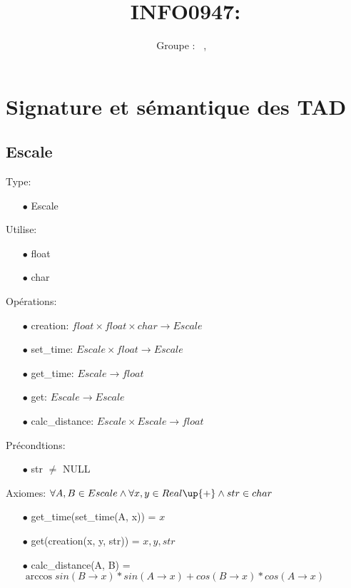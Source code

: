 \documentclass[a4paper, 11pt, oneside]{article}
\title{INFO0947: \intitule}
\author{Groupe \GrNbr : \PrenomUN~\textsc{\NomUN}, \PrenomDEUX~\textsc{\NomDEUX}}
\date{}
\newcommand{\tablemat}{~}
\renewcommand{\tablemat}{\tableofcontents}
\begin{document}
\maketitle
\newpage
\tablemat
\newpage

\section{Signature et sémantique des TAD}
\subsection{Escale}

\noindent Type: 
    \begin{itemize}
        \item[$\bullet$] Escale
    \end{itemize}
    Utilise: 
    \begin{itemize}
        \item[$\bullet$] float
        \item[$\bullet$] char
    \end{itemize}
    Opérations: 
    \begin{itemize}
        \item[$\bullet$] creation: $float \times float \times char \rightarrow Escale$
        \item[$\bullet$] set\_time: $Escale \times float \rightarrow Escale$
        \item[$\bullet$] get\_time: $Escale \rightarrow float$
        \item[$\bullet$] get: $Escale \rightarrow Escale$
        \item[$\bullet$] calc\_distance: $Escale \times Escale \rightarrow float$
    \end{itemize}
    Précondtions:
    \begin{itemize}
        \item[$\bullet$] str $\ne$ NULL
    \end{itemize}
    Axiomes: $ \forall A, B \in Escale \land \forall x,y \in Real\up{+} \land str \in char $
    \begin{itemize}
        \item[$\bullet$] get\_time(set\_time(A, x)) = $x$
        \item[$\bullet$] get(creation(x, y, str)) = $x, y, str$
        \item[$\bullet$] calc\_distance(A, B) = $\arccos{sin(B \rightarrow x) * sin(A \rightarrow x) + cos(B \rightarrow x) * cos(A \rightarrow x)}$
    \end{itemize}
\end{document}
